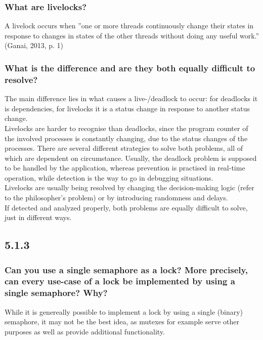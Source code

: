 \documentclass[12pt, a4paper]{article}
\begin{document}
\subsubsection*{What are livelocks?}
A livelock occurs when ''one or more threads continuously change their states in response to changes in 
states of the other threads without doing any useful work.'' (Ganai, 2013, p. 1)\\
\subsubsection*{What is the difference and are they both equally difficult to resolve?}
The main difference lies in what causes a live-/deadlock to occur: for deadlocks it is dependencies, for 
livelocks it is a status change in response to another status change. \\
Livelocks are harder to recognise than deadlocks, since the program counter of the involved processes 
is constantly changing, due to the status changes of the processes. There are several different strategies 
to solve both problems, all of which are dependent on circumstance. Usually, the deadlock problem is supposed 
to be handled by the application, whereas prevention is practised in real-time operation, while detection is 
the way to go in debugging situations.\\
Livelocks are usually being resolved by changing the decision-making logic (refer to the philosopher's problem) 
or by introducing randomness and delays. \\
If detected and analyzed properly, both problems are equally difficult to solve, just in different ways. 

\subsection*{5.1.3}
\subsubsection*{Can you use a single semaphore as a lock? More precisely, can every use-case of a lock be 
implemented by using a single semaphore? Why?}
While it is genereally possible to implement a lock by using a single (binary) semaphore, it may not be 
the best idea, as mutexes for example serve other purposes as well as provide additional functionality.
\end{document}
